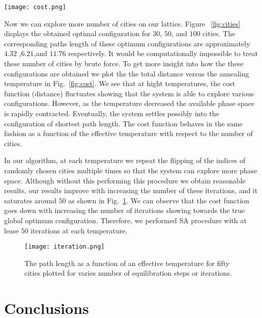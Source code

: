 \documentclass[aps,prb,twocolumn,showpacs,floatfix,superscriptaddress]{revtex4-1}
\begin{document}
\begin{figure*}
        \texttt{[image: cost.png]}
        \caption{The length of the shortest paths as functions of an effective temperature using simulated annealing method for thirty, fifty, and hundred cities. Here, the path length and the temperature have the same units (or are taken to be unitless)}
        \label{fig:cost}
\end{figure*}

Now we can explore more number of cities on our lattice. Figure ~\ref{fig:cities} displays the obtained optimal configuration for $30$, $50$, and $100$ cities. The corresponding paths length of these optimum configurations are approximately $4.32$ ,$6.21$,and $11.76$ respectively. It would be computationally impossible to treat these number of cities by brute force. To get more insight into how the these configurations are obtained we plot the the total distance versus the annealing temperature in Fig.~\ref{fig:cost}. We see that at hight temperatures, the cost function (distance) fluctuates showing that the system is able to explore various configurations. However, as the temperature decreased the available phase space is rapidly contracted. Eventually, the system settles possibly into the configuration of shortest path length. The cost function behaves in the same fashion as a function of the effective temperature with respect to the number of cities.

In our algorithm, at each temperature we repeat the flipping of the indices of randomly chosen cities multiple times so that the system can explore more phase space. Although without this performing this procedure we obtain reasonable results, our results improve with increasing the number of these iterations, and it saturates around $50$ as shown in Fig.~\ref{fig:iteration}. We can observe that the cost function goes down with increasing the number of iterations showing towards the true global optimum configuration. Therefore, we performed SA procedure with at lease $50$ iterations at each temperature.   
\begin{figure}
        \texttt{[image: iteration.png]}
        \caption{The path length as a function of an effective temperature for fifty cities plotted for varies number of equilibration steps or iterations.}
        \label{fig:iteration}
\end{figure}

\section{Conclusions}
\end{document}
